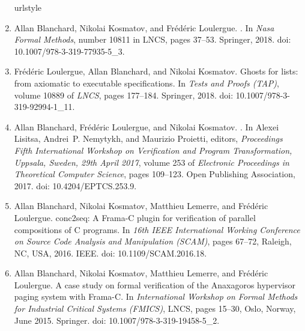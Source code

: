 \documentclass[11pt]{article}
\begin{document}
\begin{enumerate}
\providecommand{\natexlab}[1]{#1}
\providecommand{\url}[1]{\texttt{#1}}
\expandafter\ifx\csname urlstyle\endcsname\relax
  \providecommand{\doi}[1]{doi: #1}\else
  \providecommand{\doi}{doi: \begingroup \urlstyle{rm}\Url}\fi

\item Allan Blanchard, Nikolai Kosmatov, and Fr\'{e}d\'{e}ric
  Loulergue.  .  \newblock In \emph{Nasa Formal
    Methods}, number 10811 in LNCS, pages 37--53.  Springer, 2018.
  \newblock \doi{10.1007/978-3-319-77935-5_3}.

\item Fr\'{e}d\'{e}ric Loulergue, Allan Blanchard, and Nikolai
  Kosmatov.  \newblock Ghosts for lists: from axiomatic to executable
  specifications.  \newblock In \emph{Tests and Proofs (TAP)}, volume
  10889 of \emph{LNCS}, pages 177--184. Springer, 2018.  \newblock
  \doi{10.1007/978-3-319-92994-1_11}.

\item Allan Blanchard, Fr\'ed\'eric Loulergue, and Nikolai Kosmatov.
  .  \newblock In Alexei
  Lisitsa, Andrei~P. Nemytykh, and Maurizio Proietti, editors,
  \emph{Proceedings Fifth International Workshop on Verification and
    Program Transformation, Uppsala, Sweden, 29th April 2017}, volume
  253 of \emph{Electronic Proceedings in Theoretical Computer
    Science}, pages 109--123. Open Publishing Association, 2017.
  \newblock \doi{10.4204/EPTCS.253.9}.

\item Allan Blanchard, Nikolai Kosmatov, Matthieu Lemerre, and
  Fr\'{e}d\'{e}ric Loulergue.  \newblock conc2seq: A {F}rama-{C}
  plugin for verification of parallel compositions of {C} programs.
  \newblock In \emph{16th IEEE International Working Conference on
    Source Code Analysis and Manipulation (SCAM)}, pages 67--72,
  Raleigh, NC, USA, 2016.  IEEE.  \newblock
  \doi{10.1109/SCAM.2016.18}.

\item Allan Blanchard, Nikolai Kosmatov, Matthieu Lemerre, and
  Fr\'{e}d\'{e}ric Loulergue.  \newblock A case study on formal
  verification of the {A}naxagoros hypervisor paging system with
  {F}rama-{C}.  \newblock In \emph{International Workshop on Formal
    Methods for Industrial Critical Systems (FMICS)}, LNCS, pages
  15--30, Oslo, Norway, June 2015.  Springer.  \newblock
  \doi{10.1007/978-3-319-19458-5_2}.

\end{enumerate}
\end{document}
